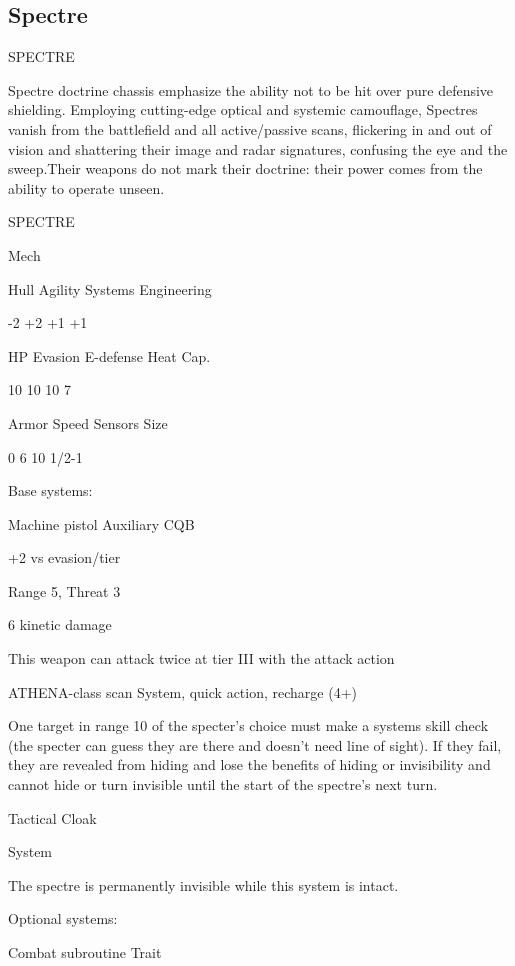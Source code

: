 \subsection{Spectre}

                                               SPECTRE

Spectre doctrine chassis emphasize the ability not to be hit over pure defensive shielding.
Employing cutting-edge optical and systemic camouflage, Spectres vanish from the battlefield
and all active/passive scans, flickering in and out of vision and shattering their image and radar
signatures, confusing the eye and the sweep.Their weapons do not mark their doctrine: their
power comes from the ability to operate unseen.


 SPECTRE

 Mech

 Hull       Agility      Systems       Engineering

 -2         +2           +1            +1

 HP         Evasion      E-defense     Heat Cap.

 10         10           10            7

 Armor      Speed        Sensors       Size

 0          6            10            1/2-1

Base systems:

Machine pistol
Auxiliary CQB

+2 vs evasion/tier

Range 5, Threat 3

6 kinetic damage

This weapon can attack twice at tier III with the attack action


ATHENA-class scan
System, quick action, recharge (4+)

One target in range 10 of the specter’s choice must make a systems skill check (the specter can
guess they are there and doesn’t need line of sight). If they fail, they are revealed from hiding and
lose the benefits of hiding or invisibility and cannot hide or turn invisible until the start of the
spectre’s next turn.


Tactical Cloak

System

The spectre is permanently invisible while this system is intact.


Optional systems:




Combat subroutine
Trait

